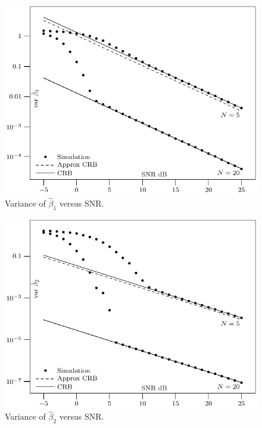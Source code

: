 \documentclass[review]{elsarticle}
\begin{document}
 \begin{figure}[p]
    	\centering 
   		\includegraphics{code/data/plot-2-mps.pdf} 
    		\caption{Variance of $\hat{\beta}_1$ versus SNR.} 
    		\label{plot:phase1} 
 \end{figure} 

\clearpage

 \begin{figure}[p]
    	\centering 
   		\includegraphics{code/data/plot-3-mps.pdf} 
    		\caption{Variance of $\hat{\beta}_2$ versus SNR.} 
    		\label{plot:phase2} 
 \end{figure}  
 
\clearpage
\end{document}
